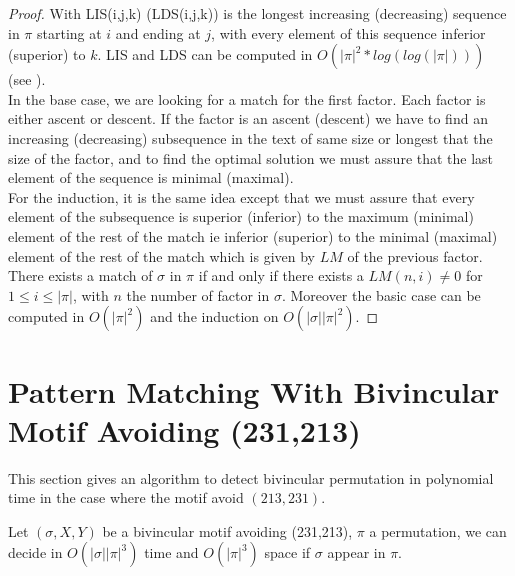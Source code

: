 \documentclass[a4paper]{llncs}
\newcommand{\ptext}{\pi}
\newcommand{\pmotif}{\sigma}
\newcommand{\x}{X}
\newcommand{\y}{Y}
\newcommand{\bmotif}{(\sigma,\x,\y)}
\newcounter{num}
\begin{document}
\begin{proof}
With LIS(i,j,k) (LDS(i,j,k)) is the longest increasing (decreasing) sequence in $\ptext$ starting at $i$ and ending at $j$,
with every element of this sequence
inferior (superior) to $k$. 
LIS and LDS can be computed in $O(|\ptext|^2*log(log(|\ptext|)))$ (see \cite{Bespamyatnikh00enumeratinglongest}).\\
			
In the base case, 
we are looking for a match for the first factor.
Each factor is either ascent or descent.
If the factor is an ascent (descent)
we have to find an increasing (decreasing) subsequence
in the text of same size or longest that 
the size of the factor,
and to find the optimal solution 
we must assure that the last element
of the sequence is minimal (maximal).\\
For the induction, it is the same idea
except that we must assure that 
every element of the subsequence is superior (inferior)
to the maximum (minimal) element of the rest of the match
ie inferior (superior) to the minimal (maximal) element of the rest of the match
which is given by $LM$ of
the previous factor.\\

There exists a match of $\pmotif$ in $\ptext$ if and only if
there exists a $LM(n,i)\neq 0$ for $1 \leq i \leq |\ptext|$,
with $n$ the number of factor in $\pmotif$.
Moreover the basic case can be computed in $O(|\ptext|^2)$
and the induction on $O(|\pmotif||\ptext|^2)$.
\end{proof}
					

\section{Pattern Matching With Bivincular Motif Avoiding (231,213)}	
\label{section:bivincular}

This section gives an algorithm to detect bivincular permutation in polynomial time in the case where the motif avoid $(213,231)$.

			\begin{proposition}
			Let $\bmotif$ be a bivincular motif 
			avoiding (231,213), 
			$\ptext$ a permutation,
			we can decide in $O(|\pmotif||\ptext|^3)$ time
			and $O(|\ptext|^3)$ space
			if $\pmotif$ 
			appear in $\ptext$.
			\end{proposition}
					
\end{document}
